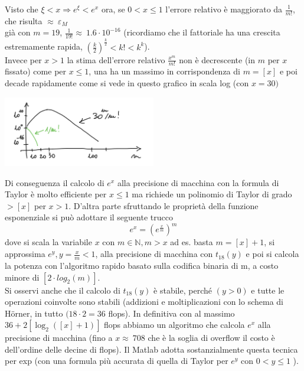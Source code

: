 \documentclass[12pt]{article}
\begin{document}
\begin{flushleft}
Visto che $\xi<x \Rightarrow e^\xi < e^x$ ora, se $0<x\leq1$ l'errore relativo è maggiorato da $\frac{1}{m!}$, che risulta $\approx{~} \varepsilon_M$ \\già con $m=19$, $\frac{1}{19!}\approx{~}1.6\cdot10^{-16}$ (ricordiamo che il fattoriale ha una crescita estremamente rapida, $\left(\frac{k}{2}\right)^{\frac{k}{2}}<k!<k^k$).
\\Invece per $x>1$ la stima dell'errore relativo $\frac{x^m}{m!}$ non è decrescente (in $m$ per $x$ fissato) come per $x \leq 1$, una ha un massimo in corrispondenza di $m =[x]$ e poi decade rapidamente come si vede in questo grafico in scala log (con $x=30)$
\begin{center}
\par
    \includegraphics[width=0.5\textwidth]{grafo1.png}\par
\end{center}
Di conseguenza il calcolo di $e^x$ alla precisione di macchina con la formula di Taylor è molto efficiente per $x \leq 1$ ma richiede un polinomio di Taylor di grado $> \left[x\right]$ per $x>1$. D'altra parte sfruttando le proprietà della funzione esponenziale si può adottare il seguente trucco
\begin{equation*}
    e^x = (e^{\frac{x}{m}})^m
\end{equation*}
dove si scala la variabile $x$ con $m \in \mathbb{N} , m > x$ ad es. basta $m = [x]+1$, si approssima $e^y, y = \frac{x}{m}<1$, alla precisione di macchina con $t_{18}(y)$ e poi si calcola la potenza con l'algoritmo rapido basato sulla codifica binaria di m, a costo minore di $[2\cdot log_2(m)]$.\\
Si osservi anche che il calcolo di $t_{18} (y)$ è stabile, perché $(y>0)$ e tutte le operazioni coinvolte sono stabili (addizioni e moltiplicazioni con lo schema di Hörner, in tutto $(18\cdot 2=36$ flops). In definitiva con al massimo $36+2\left[ \log_2\left(\left[x\right]+1\right)\right]$ flops abbiamo un algoritmo che calcola \(e^x\) alla precisione di macchina (fino a \( x \approx{~} 708\) che è la soglia di overflow il costo è dell'ordine delle decine di flops).
Il Matlab adotta sostanzialmente questa tecnica per exp (con una formula più accurata di quella di Taylor per \(e^y\) con \(0<y\leq 1\) ).
\end{flushleft}
\end{document}
